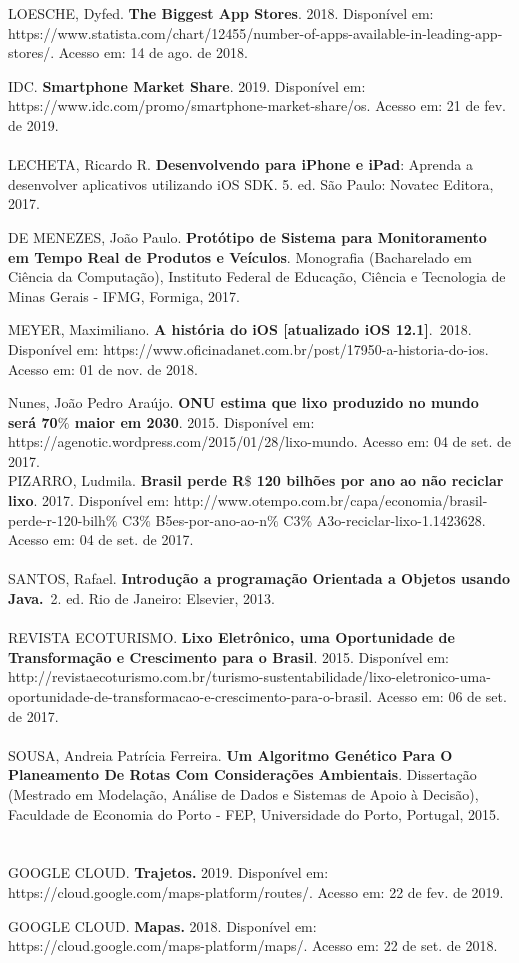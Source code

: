 LOESCHE, Dyfed. \textbf{The Biggest App Stores}. 2018. Disponível em:
https://www.statista.com/chart/12455/number-of-apps-available-in-leading-app-stores/.
Acesso em: 14 de ago. de 2018.


IDC. \textbf{Smartphone Market Share}. 2019. Disponível em:
https://www.idc.com/promo/smartphone-market-share/os. Acesso em: 21 de fev. de 2019.\\
 \\

LECHETA, Ricardo R. \textbf{Desenvolvendo para iPhone e iPad}: Aprenda a desenvolver
aplicativos utilizando iOS SDK. 5. ed. São Paulo: Novatec Editora, 2017.


DE MENEZES, João Paulo. \textbf{Protótipo de Sistema para Monitoramento em Tempo Real de
Produtos e Veículos}. Monografia (Bacharelado em Ciência da Computação), Instituto Federal de
Educação, Ciência e Tecnologia de Minas Gerais - IFMG, Formiga, 2017.


MEYER, Maximiliano. \textbf{A história do iOS [atualizado iOS 12.1]}.\ 2018.  Disponível em:
https://www.oficinadanet.com.br/post/17950-a-historia-do-ios. Acesso em: 01 de nov. de 2018.


Nunes, João Pedro Araújo. \textbf{ONU estima que lixo produzido no mundo será 70$\%$  maior
em 2030}. 2015. Disponível em: https://agenotic.wordpress.com/2015/01/28/lixo-mundo.
Acesso em: 04 de set. de 2017.\\


PIZARRO, Ludmila. \textbf{Brasil perde R$\$$ 120 bilhões por ano ao não reciclar lixo}. 2017.
Disponível em:
http://www.otempo.com.br/capa/economia/brasil-perde-r-120-bilh$\%$ C3$\%$ B5es-por-ano-ao-n$\%$ C3$\%$ A3o-reciclar-lixo-1.1423628.
Acesso em: 04 de set. de 2017.\\
 \\
SANTOS, Rafael. \textbf{Introdução a programação Orientada a Objetos usando Java.}\ 2. ed.
Rio de Janeiro: Elsevier, 2013.\\
 \\
REVISTA ECOTURISMO.\textbf{ Lixo Eletrônico, uma Oportunidade de Transformação e Crescimento
para o Brasil}. 2015. Disponível em:
http://revistaecoturismo.com.br/turismo-sustentabilidade/lixo-eletronico-uma-oportunidade-de-transformacao-e-crescimento-para-o-brasil.
Acesso em: 06 de set. de 2017.\\
 \\
SOUSA, Andreia Patrícia Ferreira. \textbf{Um Algoritmo Genético Para O Planeamento De Rotas
Com Considerações Ambientais}. Dissertação (Mestrado em Modelação, Análise de Dados e
Sistemas de Apoio à Decisão), Faculdade de Economia do Porto - FEP, Universidade do Porto,
Portugal, 2015.\\
 \\
 \\
GOOGLE CLOUD. \textbf{Trajetos. }2019. Disponível em:
https://cloud.google.com/maps-platform/routes/. Acesso em: 22 de fev. de 2019.

GOOGLE CLOUD. \textbf{Mapas. }2018. Disponível em:
https://cloud.google.com/maps-platform/maps/. Acesso em: 22 de set. de 2018.\\

